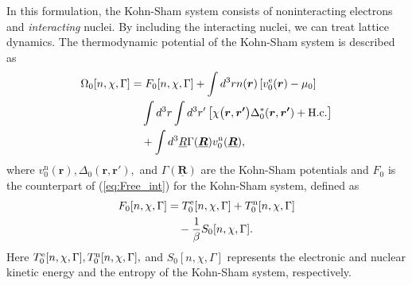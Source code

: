 In this formulation, the Kohn-Sham system consists of noninteracting electrons and {\it interacting} nuclei. 
By including the interacting nuclei, we can treat lattice dynamics.
The thermodynamic potential of the Kohn-Sham system is described as
%
\begin{equation} %
\label{eq:grand_pot_KS}
\begin{split}
	\Omega_0[n, \chi, \Gamma] &= F_0[n, \chi, \Gamma] + \int d^3r n(\bm{r}) \left[v^{\rm e}_0(\bm{r})-\mu_0 \right] \\
						&\quad \int d^3r \int d^3r' \left[\chi \bigl(\bm{r}, \bm{r'} \bigr)
	                                       \Delta^{\ast}_0(\bm{r}, \bm{r'}) + {\rm H.c.} \right]\\
	                   &\quad+ \int d^3\underline{R} \Gamma(\underline{\bm{R}})v^{\rm n}_0(\underline{\bm{R}}),
\end{split}
\end{equation}
%
where $v^{\mathrm n}_0(\bm{r}), \Delta_0(\bm{r}, \bm{r'}),$ and $\Gamma(\underline{\bm{R}})$ are the 
Kohn-Sham potentials and $F_0$ is the counterpart of (\ref{eq:Free_int}) for the Kohn-Sham system, defined as
%
\begin{equation} %
\begin{split}
	F_0[n, \chi, \Gamma] &= T^{\rm e}_0[n, \chi, \Gamma] + T^{\rm n}_0[n, \chi, \Gamma] \\
	                                     &\quad - \frac{1}{\beta}S_0[n, \chi, \Gamma].
\end{split}
\end{equation}
%
Here $T^{\rm e}_0[n, \chi, \Gamma], T^{\rm n}_0[n, \chi, \Gamma],$ and $S_0[n, \chi, \Gamma]$ 
represents the electronic and nuclear kinetic energy and the entropy of the Kohn-Sham system, respectively.
%

